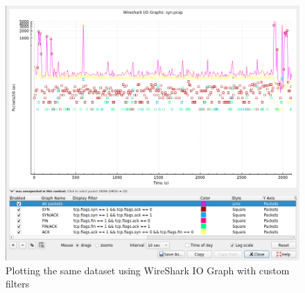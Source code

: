 \begin{figure}[]
    \centering
    \includegraphics[width=13cm]{images/evaluation_wireshark_iograph_synflood.png}
    \caption{Plotting the same dataset using WireShark IO Graph with custom filters}
    \label{fig:synfloodpiechart}
\end{figure}

